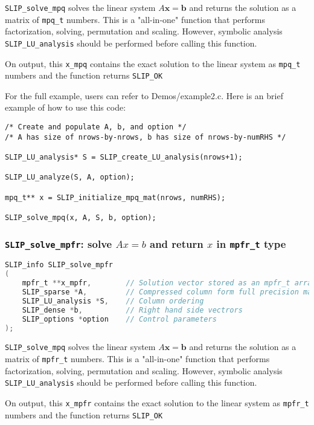\documentclass[11pt]{article}
\theoremstyle{definition}
\begin{document}
\verb|SLIP_solve_mpq| solves the linear system $A\mathbf{x}=\mathbf{b}$ and returns the solution as a matrix of \verb|mpq_t| numbers. This is a "all-in-one" function that performs factorization, solving, permutation and scaling. However, symbolic analysis \verb|SLIP_LU_analysis| should be performed before calling this function.

On output, this \verb|x_mpq| contains the exact solution to the linear system as \verb|mpq_t| numbers and the function returns \verb|SLIP_OK|

For the full example, users can refer to Demos/example2.c. Here is an brief example of how to use this code:

\begin{verbatim}
/* Create and populate A, b, and option */
/* A has size of nrows-by-nrows, b has size of nrows-by-numRHS */

SLIP_LU_analysis* S = SLIP_create_LU_analysis(nrows+1);

SLIP_LU_analyze(S, A, option);

mpq_t** x = SLIP_initialize_mpq_mat(nrows, numRHS);

SLIP_solve_mpq(x, A, S, b, option);

\end{verbatim}

\cprotect\subsubsection{\verb|SLIP_solve_mpfr|: solve $Ax=b$ and return $x$ in \verb|mpfr_t| type}\label{ss:SLIP_solve_mpfr}

\begin{lstlisting}[language=C,frame=single]
SLIP_info SLIP_solve_mpfr
(
    mpfr_t **x_mpfr,        // Solution vector stored as an mpfr_t array
    SLIP_sparse *A,         // Compressed column form full precision matrix A
    SLIP_LU_analysis *S,    // Column ordering
    SLIP_dense *b,          // Right hand side vectrors
    SLIP_options *option    // Control parameters
);
\end{lstlisting}

\verb|SLIP_solve_mpq| solves the linear system $A\mathbf{x}=\mathbf{b}$ and returns the solution as a matrix of \verb|mpfr_t| numbers. This is a "all-in-one" function that performs factorization, solving, permutation and scaling. However, symbolic analysis \verb|SLIP_LU_analysis| should be performed before calling this function.

On output, this \verb|x_mpfr| contains the exact solution to the linear system as \verb|mpfr_t| numbers and the function returns \verb|SLIP_OK|
\end{document}
